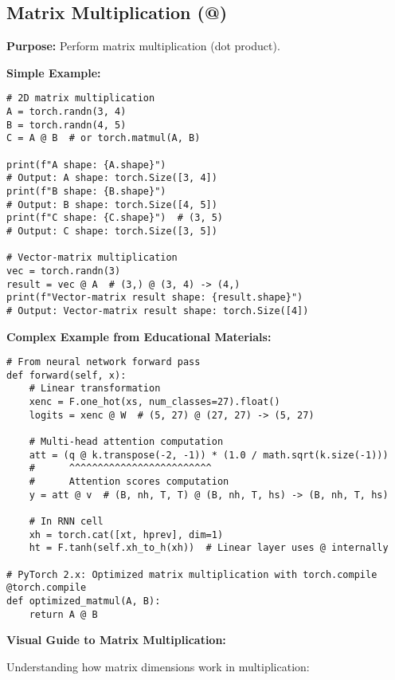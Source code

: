 \documentclass[11pt,a4paper]{book}
\begin{document}
\subsection{Matrix Multiplication (@)}

\textbf{Purpose:} Perform matrix multiplication (dot product).

\textbf{Simple Example:}
\begin{verbatim}
# 2D matrix multiplication
A = torch.randn(3, 4)
B = torch.randn(4, 5)
C = A @ B  # or torch.matmul(A, B)

print(f"A shape: {A.shape}")
# Output: A shape: torch.Size([3, 4])
print(f"B shape: {B.shape}")
# Output: B shape: torch.Size([4, 5])
print(f"C shape: {C.shape}")  # (3, 5)
# Output: C shape: torch.Size([3, 5])

# Vector-matrix multiplication
vec = torch.randn(3)
result = vec @ A  # (3,) @ (3, 4) -> (4,)
print(f"Vector-matrix result shape: {result.shape}")
# Output: Vector-matrix result shape: torch.Size([4])
\end{verbatim}

\textbf{Complex Example from Educational Materials:}
\begin{verbatim}
# From neural network forward pass
def forward(self, x):
    # Linear transformation
    xenc = F.one_hot(xs, num_classes=27).float()
    logits = xenc @ W  # (5, 27) @ (27, 27) -> (5, 27)
    
    # Multi-head attention computation
    att = (q @ k.transpose(-2, -1)) * (1.0 / math.sqrt(k.size(-1)))
    #      ^^^^^^^^^^^^^^^^^^^^^^^^^
    #      Attention scores computation
    y = att @ v  # (B, nh, T, T) @ (B, nh, T, hs) -> (B, nh, T, hs)
    
    # In RNN cell
    xh = torch.cat([xt, hprev], dim=1)
    ht = F.tanh(self.xh_to_h(xh))  # Linear layer uses @ internally

# PyTorch 2.x: Optimized matrix multiplication with torch.compile
@torch.compile
def optimized_matmul(A, B):
    return A @ B
\end{verbatim}

\textbf{Visual Guide to Matrix Multiplication:}

Understanding how matrix dimensions work in multiplication:
\end{document}
